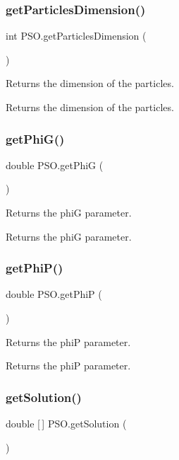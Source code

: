 \subsubsection{\texorpdfstring{get\+Particles\+Dimension()}{getParticlesDimension()}}
{\footnotesize\ttfamily int P\+S\+O.\+get\+Particles\+Dimension (\begin{DoxyParamCaption}{ }\end{DoxyParamCaption})}

Returns the dimension of the particles. \begin{DoxyReturn}{Returns}
the dimension of the particles. 
\end{DoxyReturn}
\mbox{\label{class_p_s_o_a9ddf1bc2e611d1959fe4f6fdef960b0e}} 
\subsubsection{\texorpdfstring{get\+Phi\+G()}{getPhiG()}}
{\footnotesize\ttfamily double P\+S\+O.\+get\+PhiG (\begin{DoxyParamCaption}{ }\end{DoxyParamCaption})}

Returns the phiG parameter. \begin{DoxyReturn}{Returns}
the phiG parameter. 
\end{DoxyReturn}
\mbox{\label{class_p_s_o_a51bdbe662e545c50ac984abdba9f6448}} 
\subsubsection{\texorpdfstring{get\+Phi\+P()}{getPhiP()}}
{\footnotesize\ttfamily double P\+S\+O.\+get\+PhiP (\begin{DoxyParamCaption}{ }\end{DoxyParamCaption})}

Returns the phiP parameter. \begin{DoxyReturn}{Returns}
the phiP parameter. 
\end{DoxyReturn}
\mbox{\label{class_p_s_o_af3fe18f93011219d7fc3badc9220b54b}} 
\subsubsection{\texorpdfstring{get\+Solution()}{getSolution()}}
{\footnotesize\ttfamily double \mbox{[}$\,$\mbox{]} P\+S\+O.\+get\+Solution (\begin{DoxyParamCaption}{ }\end{DoxyParamCaption})}

